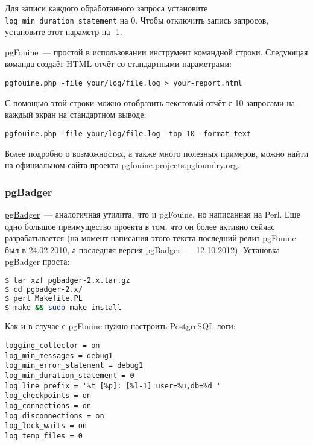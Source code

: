 Для записи каждого обработанного запроса установите \lstinline!log_min_duration_statement! на 0. Чтобы отключить запись запросов, установите этот параметр на -1.

pgFouine~--- простой в использовании инструмент командной строки. Следующая команда создаёт HTML-отчёт со стандартными параметрами:

\begin{lstlisting}[label=lst:sql_performance7,caption=pgFouine]
pgfouine.php -file your/log/file.log > your-report.html
\end{lstlisting}

С помощью этой строки можно отобразить текстовый отчёт с 10 запросами на каждый экран на стандартном выводе:

\begin{lstlisting}[label=lst:sql_performance8,caption=pgFouine]
pgfouine.php -file your/log/file.log -top 10 -format text
\end{lstlisting}

Более подробно о возможностях, а также много полезных примеров, можно найти на официальном сайта проекта \href{http://pgfouine.projects.pgfoundry.org/}{pgfouine.projects.pgfoundry.org}.

\subsubsection{pgBadger}

\href{http://dalibo.github.com/pgbadger/}{pgBadger}~--- аналогичная утилита, что и pgFouine, но написанная на Perl. Еще одно большое преимущество проекта в том, что он более активно сейчас разрабатывается (на момент написания этого текста последний релиз pgFouine был в 24.02.2010, а последняя версия pgBadger~--- 12.10.2012). Установка pgBadger проста:

\begin{lstlisting}[language=Bash,label=lst:sql_performance9,caption=Установка pgBadger]
$ tar xzf pgbadger-2.x.tar.gz
$ cd pgbadger-2.x/
$ perl Makefile.PL
$ make && sudo make install
\end{lstlisting}

Как и в случае с pgFouine нужно настроить PostgreSQL логи:

\begin{lstlisting}[label=lst:sql_performance10,caption=Настройка логов PostgreSQL]
logging_collector = on
log_min_messages = debug1
log_min_error_statement = debug1
log_min_duration_statement = 0
log_line_prefix = '%t [%p]: [%l-1] user=%u,db=%d '
log_checkpoints = on
log_connections = on
log_disconnections = on
log_lock_waits = on
log_temp_files = 0
\end{lstlisting}

